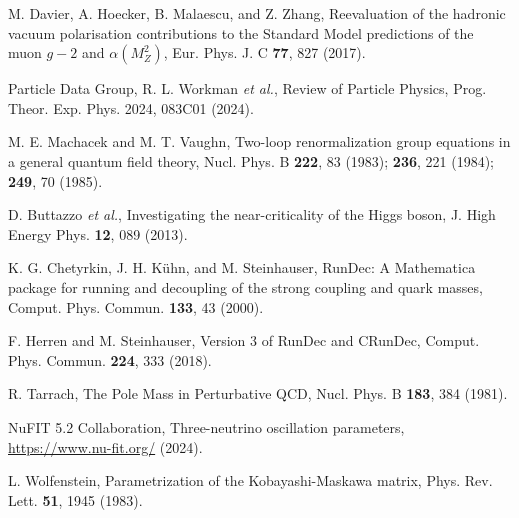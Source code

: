 \documentclass[%
amsmath,amssymb,
aps,
prb,
floatfix, showkeys, 10pt,
]{revtex4-2}
\begin{document}
\begin{thebibliography}{99}
M. Davier, A. Hoecker, B. Malaescu, and Z. Zhang, 
Reevaluation of the hadronic vacuum polarisation contributions to the Standard Model predictions of the muon $g-2$ and $\alpha(M_Z^2)$, 
Eur. Phys. J. C \textbf{77}, 827 (2017).

Particle Data Group, R. L. Workman \textit{et al.}, 
Review of Particle Physics, 
Prog. Theor. Exp. Phys. 2024, 083C01 (2024).

M. E. Machacek and M. T. Vaughn, 
Two-loop renormalization group equations in a general quantum field theory, 
Nucl. Phys. B \textbf{222}, 83 (1983); \textbf{236}, 221 (1984); \textbf{249}, 70 (1985).

D. Buttazzo \textit{et al.}, 
Investigating the near-criticality of the Higgs boson, 
J. High Energy Phys. \textbf{12}, 089 (2013).

K. G. Chetyrkin, J. H. Kühn, and M. Steinhauser, 
RunDec: A Mathematica package for running and decoupling of the strong coupling and quark masses, 
Comput. Phys. Commun. \textbf{133}, 43 (2000).

F. Herren and M. Steinhauser, 
Version 3 of RunDec and CRunDec, 
Comput. Phys. Commun. \textbf{224}, 333 (2018).

R. Tarrach, 
The Pole Mass in Perturbative QCD, 
Nucl. Phys. B \textbf{183}, 384 (1981).

NuFIT 5.2 Collaboration, 
Three-neutrino oscillation parameters, 
\url{https://www.nu-fit.org/} (2024).

L. Wolfenstein, 
Parametrization of the Kobayashi-Maskawa matrix, 
Phys. Rev. Lett. \textbf{51}, 1945 (1983).

\end{thebibliography}
\end{document}
